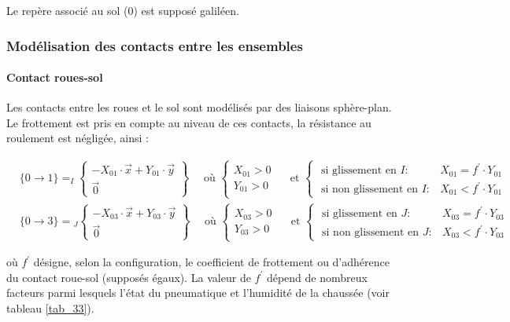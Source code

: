 Le repère associé au sol (0) est supposé galiléen.

\subsubsection{Modélisation des contacts entre les ensembles}
\paragraph*{Contact roues-sol} 
Les contacts entre les roues et le sol sont modélisés par des liaisons sphère-plan. Le frottement est pris en compte au niveau de ces contacts, la résistance au roulement est négligée, ainsi :

$
\begin{aligned}
& \{0 \rightarrow 1\}=_{I}\left\{\begin{array}{c}
-X_{01} \cdot \vec{x}+Y_{01} \cdot \vec{y} \\
\overrightarrow{0}
\end{array}\right\} \quad \text { où }\left\{\begin{array} { c } 
{ X _ { 0 1 } > 0 } \\
{ Y _ { 0 1 } > 0 }
\end{array} \quad \text { et } \left\{\begin{array}{rl}
\text { si glissement en } I: & X_{01}=f^{\prime} \cdot Y_{01} \\
\text { si non glissement en } I: & X_{01}<f^{\prime} \cdot Y_{01}
\end{array}\right.\right. \\
& \{0 \rightarrow 3\}={ }_{J}\left\{\begin{array}{c}
-X_{03} \cdot \vec{x}+Y_{03} \cdot \vec{y} \\
\overrightarrow{0}
\end{array}\right\} \quad \text { où }\left\{\begin{array} { c } 
{ X _ { 0 3 } > 0 } \\
{ Y _ { 0 3 } > 0 }
\end{array} \quad \text { et } \left\{\begin{array}{rl}
\text { si glissement en } J: & X_{03}=f^{\prime} \cdot Y_{03} \\
\text { si non glissement en } J: & X_{03}<f^{\prime} \cdot Y_{03}
\end{array}\right.\right.
\end{aligned}
$

où \(f^{\prime}\) désigne, selon la configuration, le coefficient de frottement ou d'adhérence du contact roue-sol (supposés égaux). La valeur de \(f^{\prime}\) dépend de nombreux facteurs parmi lesquels l'état du pneumatique et l'humidité de la chaussée (voir tableau \ref{tab_33}).

